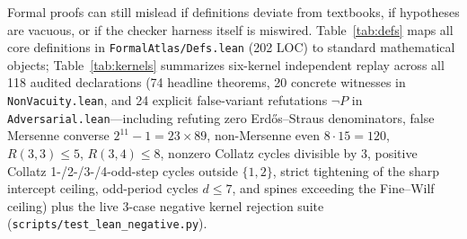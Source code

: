 \documentclass[11pt,reqno]{amsart}
\theoremstyle{plain}
\theoremstyle{definition}
\newcommand{\code}[1]{{\upshape\nolinkurl{#1}}}
\begin{document}
Formal proofs can still mislead if definitions deviate from textbooks, if hypotheses are vacuous,
or if the checker harness itself is miswired. Table~\ref{tab:defs} maps all core definitions in
\code{FormalAtlas/Defs.lean} (202 LOC) to standard mathematical objects; Table~\ref{tab:kernels}
summarizes six-kernel independent replay across all 118 audited declarations (74 headline
theorems, 20 concrete witnesses in \code{NonVacuity.lean}, and 24 explicit false-variant
refutations $\neg P$ in \code{Adversarial.lean}---including refuting zero Erd\H{o}s--Straus
denominators, false Mersenne converse $2^{11}-1 = 23 \times 89$, non-Mersenne even $8\cdot 15 = 120$,
$R(3,3)\le 5$, $R(3,4)\le 8$, nonzero Collatz cycles divisible by $3$, positive Collatz
1-/2-/3-/4-odd-step cycles outside $\{1,2\}$, strict tightening of the sharp intercept ceiling,
odd-period cycles $d \le 7$, and spines exceeding the Fine--Wilf ceiling) plus the live 3-case
negative kernel rejection suite (\code{scripts/test_lean_negative.py}).
\end{document}
